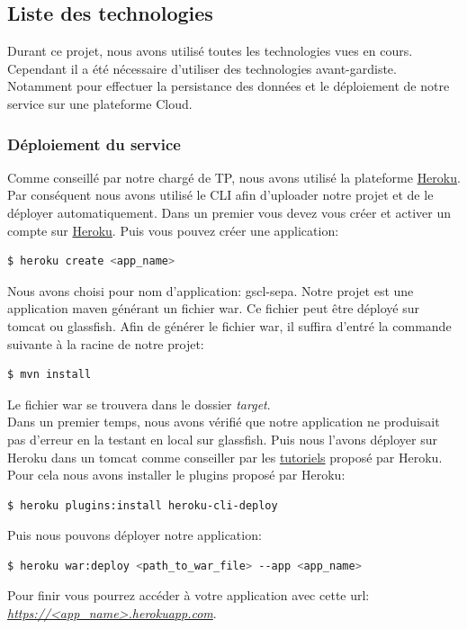 \documentclass{article}
\begin{document}
    \subsection{Liste des technologies}
      Durant ce projet, nous avons utilisé toutes les technologies vues en cours. Cependant il a été nécessaire 
      d'utiliser des technologies avant-gardiste.
      Notamment pour effectuer la persistance des données et le déploiement de notre service sur une plateforme Cloud.
      \subsubsection{Déploiement du service}
	Comme conseillé par notre chargé de TP, nous avons utilisé la plateforme \href{https://www.heroku.com}{Heroku}.
	Par conséquent nous avons utilisé le CLI afin d'uploader notre projet et de le déployer automatiquement.
	Dans un premier vous devez vous créer et activer un compte sur \href{https://www.heroku.com}{Heroku}. Puis vous pouvez créer une application:
	\begin{lstlisting}[language=bash]
    $ heroku create <app_name>
	\end{lstlisting}
	Nous avons choisi pour nom d'application: gscl-sepa.
	Notre projet est une application maven générant un fichier war. Ce fichier peut être déployé sur tomcat ou glassfish. Afin de générer
	le fichier war, il suffira d'entré la commande suivante à la racine de notre projet:
	\begin{lstlisting}[language=bash]
    $ mvn install
	\end{lstlisting}
	Le fichier war se trouvera dans le dossier \emph{target}. \\
	Dans un premier temps, nous avons vérifié que notre application ne produisait pas d'erreur en la testant en local sur glassfish.
	Puis nous l'avons déployer sur Heroku dans un tomcat comme conseiller par les \href{https://devcenter.heroku.com/articles/war-deployment}{tutoriels} proposé par Heroku.
	Pour cela nous avons installer le plugins proposé par Heroku:
	\begin{lstlisting}[language=bash]
    $ heroku plugins:install heroku-cli-deploy
	\end{lstlisting}
	Puis nous pouvons déployer notre application:
	\begin{lstlisting}[language=bash]
    $ heroku war:deploy <path_to_war_file> --app <app_name>
	\end{lstlisting}
	Pour finir vous pourrez accéder à votre application avec cette url:\\ \emph{\url{https://<app_name>.herokuapp.com}}.
\end{document}
